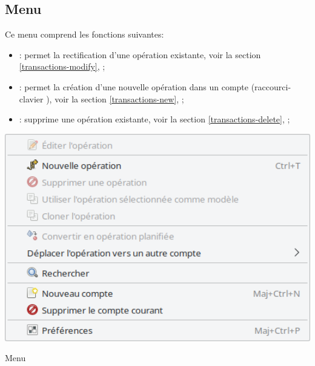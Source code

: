\subsection{Menu \label{home-menus-edit}}

Ce menu comprend les fonctions suivantes:

\vspace{3mm}
\noindent
\begin{minipage}{.7\linewidth}
	\begin{itemize}[rightmargin=.6cm]
		\item {}: permet la rectification d'une opération existante, voir la section \vref{transactions-modify}, ;
		\item {}: permet la création d'une nouvelle opération dans un compte (raccourci-clavier ), voir la section \vref{transactions-new}, ;
		\item {}: supprime une opération existante, voir la section \vref{transactions-delete}, ;
	\end{itemize}
\end{minipage}
\hspace{10pt}	
\begin{minipage}{.3\linewidth}
	\vspace{-5pt}					%
	\centering						%
	\includegraphics[width=1\textwidth]{image/screenshot/home_menubar_edit}
	\vspace{-15pt}					%
	\captionsetup{
		type=figure,%
		name=Fig.,%
		labelsep=newline}			%
	\caption{Menu }	%
	\label{home_menubar_edit}
\end{minipage}

